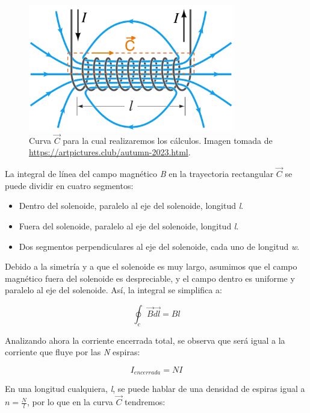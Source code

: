\begin{figure}[H]
    \centering %
    \includegraphics[width=9cm]{FigurasMemoria/integralampere.png}
    \caption{Curva \textbf{\(\vec{C}\)} para la cual realizaremos los cálculos. Imagen tomada de \href{URL}{https://artpictures.club/autumn-2023.html}.}
    \label{fig:integralampere} %
\end{figure}

La integral de línea del campo magnético \textit{B} en la trayectoria rectangular \(\vec C\) se puede dividir en cuatro segmentos:
\begin{itemize}
    \item Dentro del solenoide, paralelo al eje del solenoide, longitud \textit{l}.
    \item Fuera del solenoide, paralelo al eje del solenoide, longitud \textit{l}.
    \item Dos segmentos perpendiculares al eje del solenoide, cada uno de longitud \textit{w}.
\end{itemize}

Debido a la simetría y a que el solenoide es muy largo, asumimos que el campo magnético fuera del solenoide es despreciable, y el campo dentro es uniforme y paralelo al eje del solenoide. Así, la integral se simplifica a:

\begin{center}
    \[\oint_c\vec{B} \vec{dl}=Bl\]
\end{center}

Analizando ahora la corriente encerrada total, se observa que será igual a la corriente que fluye por las \textit{N} espiras:

\begin{center}
    \[I_{encerrada} = NI\]
\end{center}

En una longitud cualquiera, \textit{l}, se puede hablar de una densidad de espiras igual a \(n=\frac{N}{l}\), por lo que en la curva \(\vec{C}\) tendremos:

